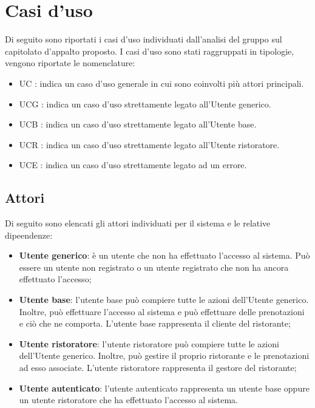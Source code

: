 \section{Casi d'uso}

Di seguito sono riportati i casi d'uso individuati
dall'analisi del gruppo sul capitolato d'appalto proposto. I casi d'uso sono stati raggruppati in tipologie, vengono riportate le nomenclature:

\begin{itemize}
	\item UC : indica un caso d'uso generale in cui sono coinvolti più attori principali.
	\item UCG : indica un caso d'uso strettamente legato all'Utente generico.
	\item UCB : indica un caso d'uso strettamente legato all'Utente base.
	\item UCR : indica un caso d'uso strettamente legato all'Utente ristoratore.
	\item UCE : indica un caso d'uso strettamente legato ad un errore.
\end{itemize}

\subsection{Attori}

Di seguito sono elencati gli attori individuati per il sistema e le relative
dipeendenze:
\begin{itemize}
	\item \textbf{Utente generico}: è un utente che non ha effettuato l'accesso al
	      sistema. Può essere un utente non registrato o un utente registrato che non ha
	      ancora effettuato l'accesso;

	\item \textbf{Utente base}: l'utente base può compiere tutte le azioni
	      dell'Utente generico. Inoltre, può effettuare l'accesso al sistema e può
	      effettuare delle prenotazioni e ciò che ne comporta. L'utente base rappresenta
	      il cliente del ristorante;

	\item \textbf{Utente ristoratore}: l'utente ristoratore può compiere tutte le
	      azioni dell'Utente generico. Inoltre, può gestire il proprio ristorante e le
	      prenotazioni ad esso associate. L'utente ristoratore rappresenta il gestore del
	      ristorante;

	\item \textbf{Utente autenticato}: l'utente autenticato rappresenta un utente
	      base oppure un utente ristoratore che ha effettuato l'accesso al sistema.
\end{itemize}
